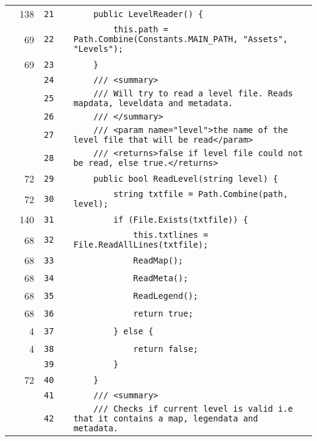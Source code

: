 \documentclass[a4paper,landscape,10pt]{article}
\begin{document}
\begin{longtable}[l]{lrrll}
\cellcolor{green} & 138 & \verb~21~ & & \verb~    public LevelReader() {~\\
\cellcolor{green} & 69 & \verb~22~ & & \verb~        this.path = Path.Combine(Constants.MAIN_PATH, "Assets", "Levels");~\\
\cellcolor{green} & 69 & \verb~23~ & & \verb~    }~\\
\cellcolor{gray} &  & \verb~24~ & & \verb~    /// <summary>~\\
\cellcolor{gray} &  & \verb~25~ & & \verb~    /// Will try to read a level file. Reads mapdata, leveldata and metadata.~\\
\cellcolor{gray} &  & \verb~26~ & & \verb~    /// </summary>~\\
\cellcolor{gray} &  & \verb~27~ & & \verb~    /// <param name="level">the name of the level file that will be read</param>~\\
\cellcolor{gray} &  & \verb~28~ & & \verb~    /// <returns>false if level file could not be read, else true.</returns>~\\
\cellcolor{green} & 72 & \verb~29~ & & \verb~    public bool ReadLevel(string level) {~\\
\cellcolor{green} & 72 & \verb~30~ & & \verb~        string txtfile = Path.Combine(path, level);~\\
\cellcolor{green} & 140 & \verb~31~ & & \verb~        if (File.Exists(txtfile)) {~\\
\cellcolor{green} & 68 & \verb~32~ & & \verb~            this.txtlines = File.ReadAllLines(txtfile);~\\
\cellcolor{green} & 68 & \verb~33~ & & \verb~            ReadMap();~\\
\cellcolor{green} & 68 & \verb~34~ & & \verb~            ReadMeta();~\\
\cellcolor{green} & 68 & \verb~35~ & & \verb~            ReadLegend();~\\
\cellcolor{green} & 68 & \verb~36~ & & \verb~            return true;~\\
\cellcolor{green} & 4 & \verb~37~ & & \verb~        } else {~\\
\cellcolor{green} & 4 & \verb~38~ & & \verb~            return false;~\\
\cellcolor{gray} &  & \verb~39~ & & \verb~        }~\\
\cellcolor{green} & 72 & \verb~40~ & & \verb~    }~\\
\cellcolor{gray} &  & \verb~41~ & & \verb~    /// <summary>~\\
\cellcolor{gray} &  & \verb~42~ & & \verb~    /// Checks if current level is valid i.e that it contains a map, legendata and metadata.~\\

\end{longtable}
\end{document}
